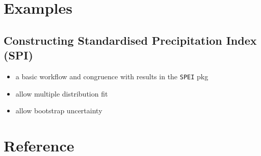 \documentclass[
]{article}
\providecommand{\tightlist}{%
  \setlength{\itemsep}{0pt}\setlength{\parskip}{0pt}}\usepackage{longtable,booktabs,array}
\begin{document}
\hypertarget{examples}{%
\section{Examples}\label{examples}}

\hypertarget{constructing-standardised-precipitation-index-spi}{%
\subsection{Constructing Standardised Precipitation Index
(SPI)}\label{constructing-standardised-precipitation-index-spi}}

\begin{itemize}
\tightlist
\item
  a basic workflow and congruence with results in the \texttt{SPEI} pkg
\item
  allow multiple distribution fit
\item
  allow bootstrap uncertainty
\end{itemize}

\hypertarget{reference}{%
\section*{Reference}\label{reference}}
\end{document}
